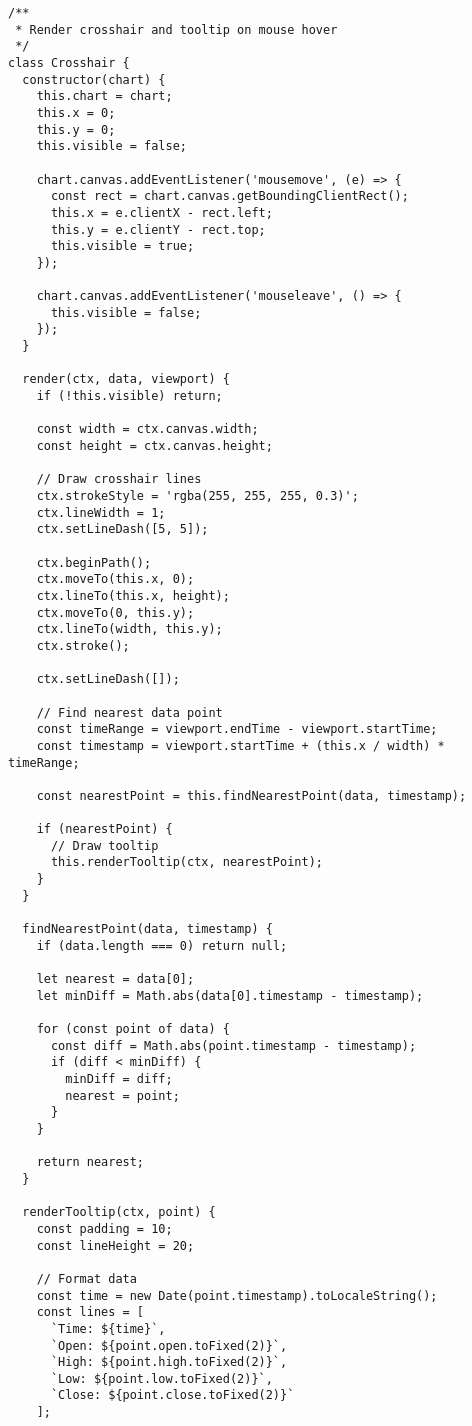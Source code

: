 \documentclass[11pt]{article}
\begin{document}
\begin{verbatim}
/**
 * Render crosshair and tooltip on mouse hover
 */
class Crosshair {
  constructor(chart) {
    this.chart = chart;
    this.x = 0;
    this.y = 0;
    this.visible = false;
    
    chart.canvas.addEventListener('mousemove', (e) => {
      const rect = chart.canvas.getBoundingClientRect();
      this.x = e.clientX - rect.left;
      this.y = e.clientY - rect.top;
      this.visible = true;
    });
    
    chart.canvas.addEventListener('mouseleave', () => {
      this.visible = false;
    });
  }
  
  render(ctx, data, viewport) {
    if (!this.visible) return;
    
    const width = ctx.canvas.width;
    const height = ctx.canvas.height;
    
    // Draw crosshair lines
    ctx.strokeStyle = 'rgba(255, 255, 255, 0.3)';
    ctx.lineWidth = 1;
    ctx.setLineDash([5, 5]);
    
    ctx.beginPath();
    ctx.moveTo(this.x, 0);
    ctx.lineTo(this.x, height);
    ctx.moveTo(0, this.y);
    ctx.lineTo(width, this.y);
    ctx.stroke();
    
    ctx.setLineDash([]);
    
    // Find nearest data point
    const timeRange = viewport.endTime - viewport.startTime;
    const timestamp = viewport.startTime + (this.x / width) * timeRange;
    
    const nearestPoint = this.findNearestPoint(data, timestamp);
    
    if (nearestPoint) {
      // Draw tooltip
      this.renderTooltip(ctx, nearestPoint);
    }
  }
  
  findNearestPoint(data, timestamp) {
    if (data.length === 0) return null;
    
    let nearest = data[0];
    let minDiff = Math.abs(data[0].timestamp - timestamp);
    
    for (const point of data) {
      const diff = Math.abs(point.timestamp - timestamp);
      if (diff < minDiff) {
        minDiff = diff;
        nearest = point;
      }
    }
    
    return nearest;
  }
  
  renderTooltip(ctx, point) {
    const padding = 10;
    const lineHeight = 20;
    
    // Format data
    const time = new Date(point.timestamp).toLocaleString();
    const lines = [
      `Time: ${time}`,
      `Open: ${point.open.toFixed(2)}`,
      `High: ${point.high.toFixed(2)}`,
      `Low: ${point.low.toFixed(2)}`,
      `Close: ${point.close.toFixed(2)}`
    ];
    

\end{verbatim}
\end{document}
